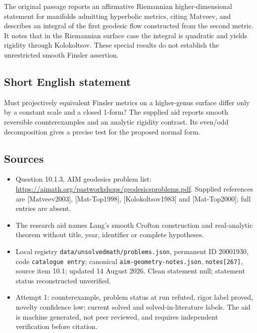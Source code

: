 \documentclass[11pt]{article}
\begin{document}
The original passage reports an affirmative Riemannian higher-dimensional statement for manifolds admitting hyperbolic metrics, citing Matveev, and describes an integral of the first geodesic flow constructed from the second metric. It notes that in the Riemannian surface case the integral is quadratic and yields rigidity through Kolokoltsov. These special results do not establish the unrestricted smooth Finsler assertion.
\subsection{Short English statement}
Must projectively equivalent Finsler metrics on a higher-genus surface differ only by a constant scale and a closed 1-form? The supplied aid reports smooth reversible counterexamples and an analytic rigidity contrast. Its even/odd decomposition gives a precise test for the proposed normal form.
\subsection{Sources}
\begin{itemize}
\item Question 10.1.3, AIM geodesics problem list: \url{https://aimath.org/pastworkshops/geodesicsproblems.pdf}. Supplied references are [Matveev2003], [Mat-Top1998], [Kolokoltsov1983] and [Mat-Top2000]; full entries are absent.
\item The research aid names Lang's smooth Crofton construction and real-analytic theorem without title, year, identifier or complete hypotheses.
\item Local registry \texttt{data/unsolvedmath/problems.json}, permanent ID 20001930, code \texttt{catalogue entry}; canonical \texttt{aim-geometry-notes.json}, \texttt{notes[267]}, source item 10.1; updated 14 August 2026. Clean statement null; statement status reconstructed unverified.
\item Attempt 1: counterexample, problem status at run refuted, rigor label proved, novelty confidence low; current solved and solved-in-literature labels. The aid is machine generated, not peer reviewed, and requires independent verification before citation.
\end{itemize}
\end{document}
